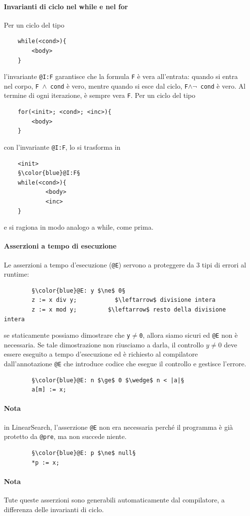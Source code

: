 \paragraph{Invarianti di ciclo nel while e nel for}
Per un ciclo del tipo \begin{lstlisting}
	while(<cond>){
		<body>
	}
\end{lstlisting}
l'invariante \texttt{@I:F} garantisce che la formula \texttt{F} è vera all'entrata: quando si entra nel corpo, \texttt{F $\wedge$ cond} è vero, mentre quando si esce dal ciclo, \texttt{F$\wedge\neg$ cond} è vero. Al termine di ogni iterazione, è sempre vera \texttt{F}.
Per un ciclo del tipo 
\begin{lstlisting}
	for(<init>; <cond>; <inc>){
		<body>
	}
\end{lstlisting}
con l'invariante \texttt{@I:F}, lo si trasforma in 
\begin{lstlisting}
	<init>
	§\color{blue}@I:F§
	while(<cond>){
			<body>
			<inc>
	}
\end{lstlisting}
e si ragiona in modo analogo a while, come prima.

\paragraph{Asserzioni a tempo di esecuzione}Le asserzioni a tempo d'esecuzione (\texttt{@E}) servono a proteggere da 3 tipi di errori al runtime:
\begin{itemize}
	\begin{lstlisting}
		§\color{blue}@E: y $\ne$ 0§
		z := x div y;			$\leftarrow$ divisione intera
		z := x mod y;         $\leftarrow$ resto della divisione intera
	\end{lstlisting} se staticamente possiamo dimostrare che \texttt{y$\ne$0}, allora siamo sicuri ed \texttt{@E} non è necessaria. Se tale dimostrazione non riusciamo a darla, il controllo $y\ne 0$ deve essere eseguito a tempo d'esecuzione ed è richiesto al compilatore dall'annotazione \texttt{@E} che introduce codice che esegue il controllo e gestisce l'errore.
	\begin{lstlisting}
		§\color{blue}@E: n $\ge$ 0 $\wedge$ n < |a|§
		a[m] := x;
	\end{lstlisting}
	\paragraph{Nota}in LinearSearch, l'asserzione \texttt{@E} non era necessaria perché il programma è già protetto da \texttt{@pre}, ma non succede niente.
	\begin{lstlisting}
		§\color{blue}@E: p $\ne$ null§
		*p := x; 
	\end{lstlisting}
\end{itemize}
\paragraph{Nota}Tute queste asserzioni sono generabili automaticamente dal compilatore, a differenza delle invarianti di ciclo.